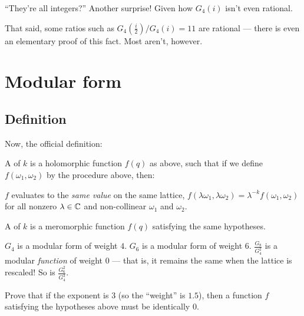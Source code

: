 ``They're all integers?'' Another surprise! Given how $G_4(i)$ isn't even rational.


\begin{remark}
	That said, some ratios such as $G_4(\frac{i}{2})/G_4(i)=11$ are rational ---
	there is even an elementary proof of this fact.
	Most aren't, however.
\end{remark}

\section{Modular form}

\subsection{Definition}

Now, the official definition:
\begin{definition}
	A  of  $k$ is a holomorphic function $f(q)$ as above,
	such that if we define $f(\omega_1, \omega_2)$ by the procedure above, then:
	\begin{itemize}
		\ii $f$ evaluates to the \emph{same value} on the same lattice,
		\ii $f(\lambda \omega_1, \lambda \omega_2) = \lambda^{-k} f(\omega_1, \omega_2)$
		for all nonzero $\lambda \in \mathbb C$ and non-collinear $\omega_1$ and $\omega_2$.
	\end{itemize}

	A  of  $k$ is a meromorphic function $f(q)$ satisfying the
	same hypotheses.
\end{definition}

\begin{example}
	\listhack
	\begin{itemize}
		\ii $G_4$ is a modular form of weight $4$.
		\ii $G_6$ is a modular form of weight $6$.
		\ii $\frac{G_8}{G_4^2}$ is a modular \emph{function} of weight $0$ ---
		that is, it remains the same when the lattice is rescaled!
		\ii So is $\frac{G_6^2}{G_4^3}$.
	\end{itemize}
\end{example}

\begin{exercise}
	Prove that if the exponent is $3$ (so the ``weight'' is $1.5$),
	then a function $f$ satisfying the hypotheses above must be identically $0$.
\end{exercise}

